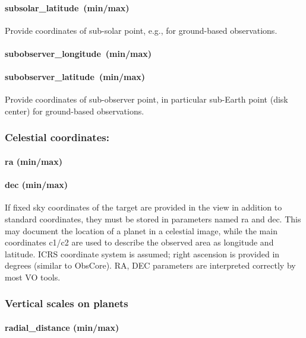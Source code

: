 \documentclass[11pt,a4paper]{ivoa}
\begin{document}
\paragraph{\textbf{subsolar\_latitude }\textbf{(min/max)}}

Provide coordinates of sub-solar point, e.g., for ground-based observations.

\paragraph{\textbf{subobserver\_longitude }\textbf{(min/max)}}

\paragraph{\textbf{subobserver\_latitude }\textbf{(min/max)}}

Provide coordinates of sub-observer point, in particular sub-Earth point (disk center) for ground-based observations.

\subsubsection{Celestial coordinates:}

\paragraph{ra (min/max)}

\paragraph{dec (min/max)}

If fixed sky coordinates of the target are provided in the view in addition to standard coordinates, they must be stored in parameters named ra and dec. This may document the location of a planet in a celestial image, while the main coordinates c1/c2 are used to describe the observed area as longitude and latitude. ICRS coordinate system is assumed; right ascension is provided in degrees (similar to ObsCore). RA, DEC parameters are interpreted correctly by most VO tools.

\subsubsection{Vertical scales on planets}

\paragraph{radial\_distance (min/max)}
\end{document}
